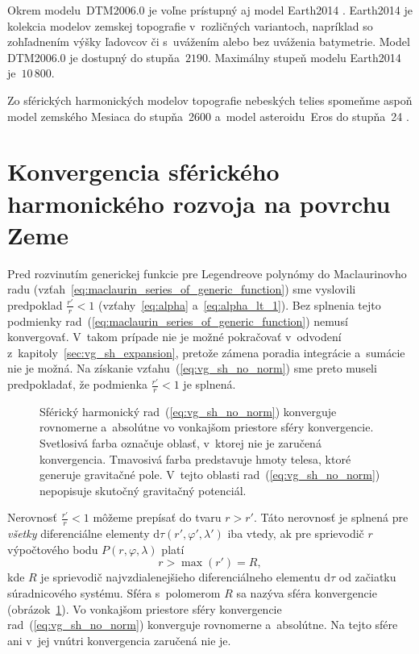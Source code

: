 \documentclass[a4paper, 12pt]{book}
\newcommand{\diff}{\mathrm d}
\begin{document}
Okrem modelu~DTM2006.0 je voľne prístupný aj model Earth2014 
\parencite{Hirt2015}.  Earth2014 je kolekcia modelov zemskej topografie 
v~rozličných variantoch, napríklad so zohľadnením výšky ľadovcov či s~uvážením 
alebo bez uváženia batymetrie.  Model DTM2006.0 je dostupný do stupňa~$2190$.  
Maximálny stupeň modelu Earth2014 je~$10\, 800$.

Zo sférických harmonických modelov topografie nebeských telies spomeňme aspoň 
model zemského Mesiaca do stupňa~2600 \parencite{Wieczorek2015} a~model 
asteroidu~Eros do stupňa~24 \parencite{Zuber2000}.






\section{Konvergencia sférického harmonického rozvoja na povrchu Zeme}
\label{sec:convergence_of_spherical_harmonics}

Pred rozvinutím generickej funkcie pre Legendreove polynómy do Maclaurinovho 
radu (vzťah~\ref{eq:maclaurin_series_of_generic_function}) sme vyslovili 
predpoklad $\frac{r'}{r} < 1$ (vzťahy~\ref{eq:alpha} a~\ref{eq:alpha_lt_1}).  
Bez splnenia tejto podmienky 
rad~(\ref{eq:maclaurin_series_of_generic_function}) nemusí konvergovať.  
V~takom prípade nie je možné pokračovať v~odvodení 
z~kapitoly~\ref{sec:vg_sh_expansion}, pretože zámena poradia integrácie 
a~sumácie nie je možná.  Na získanie vzťahu~(\ref{eq:vg_sh_no_norm}) sme preto 
museli predpokladať, že podmienka $\frac{r'}{r} < 1$ je splnená.

\begin{figure}
\centering

\caption{Sférický harmonický rad~(\ref{eq:vg_sh_no_norm}) konverguje rovnomerne 
a~absolútne vo vonkajšom priestore sféry konvergencie.  Svetlosivá farba 
označuje oblasť, v~ktorej nie je zaručená konvergencia.  Tmavosivá farba 
predstavuje hmoty telesa, ktoré generuje gravitačné pole.  V~tejto oblasti 
rad~(\ref{eq:vg_sh_no_norm}) nepopisuje skutočný gravitačný potenciál.}
\label{fig:spherical_harmonics_convergence}
\end{figure}

Nerovnosť $\frac{r'}{r} < 1$ môžeme prepísať do tvaru $r > r'$.  Táto
nerovnosť je splnená pre \emph{všetky} diferenciálne elementy $\diff \tau(r',
\varphi', \lambda')$ iba vtedy, ak pre sprievodič $r$ výpočtového bodu $P(r,
\varphi, \lambda)$ platí
%
\begin{equation}
\label{eq:spherical_harmonic_convergence}
r > \max(r') = R{,}
\end{equation}
%
kde $R$ je sprievodič najvzdialenejšieho diferenciálneho elementu $\diff\tau$ 
od začiatku súradnicového systému.  Sféra s~polomerom $R$ sa nazýva sféra 
konvergencie \parencite{Hotine} 
(obrázok~\ref{fig:spherical_harmonics_convergence}).  Vo vonkajšom priestore 
sféry konvergencie rad~(\ref{eq:vg_sh_no_norm}) konverguje rovnomerne 
a~absolútne.  Na tejto sfére ani v~jej vnútri konvergencia zaručená nie je.
\end{document}
